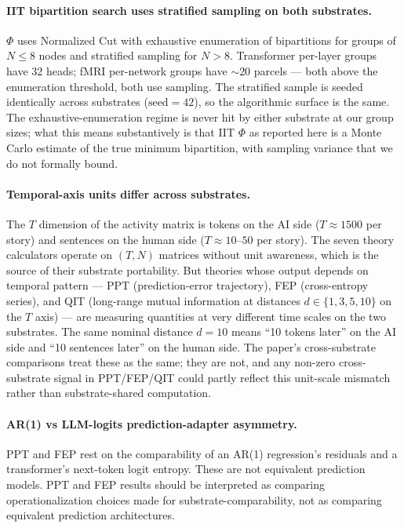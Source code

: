 \documentclass[11pt,a4paper]{article}
\begin{document}
\paragraph{IIT bipartition search uses stratified sampling on both substrates.} $\Phi$ uses Normalized Cut with exhaustive enumeration of bipartitions for groups of $N \leq 8$ nodes and stratified sampling for $N > 8$. Transformer per-layer groups have 32 heads; fMRI per-network groups have $\sim$20 parcels --- both above the enumeration threshold, both use sampling. The stratified sample is seeded identically across substrates ($\text{seed} = 42$), so the algorithmic surface is the same. The exhaustive-enumeration regime is never hit by either substrate at our group sizes; what this means substantively is that IIT $\Phi$ as reported here is a Monte Carlo estimate of the true minimum bipartition, with sampling variance that we do not formally bound.

\paragraph{Temporal-axis units differ across substrates.} The $T$ dimension of the activity matrix is tokens on the AI side ($T \approx 1500$ per story) and sentences on the human side ($T \approx 10$--$50$ per story). The seven theory calculators operate on $(T, N)$ matrices without unit awareness, which is the source of their substrate portability. But theories whose output depends on temporal pattern --- PPT (prediction-error trajectory), FEP (cross-entropy series), and QIT (long-range mutual information at distances $d \in \{1, 3, 5, 10\}$ on the $T$ axis) --- are measuring quantities at very different time scales on the two substrates. The same nominal distance $d = 10$ means ``10 tokens later'' on the AI side and ``10 sentences later'' on the human side. The paper's cross-substrate comparisons treat these as the same; they are not, and any non-zero cross-substrate signal in PPT/FEP/QIT could partly reflect this unit-scale mismatch rather than substrate-shared computation.

\paragraph{AR(1) vs LLM-logits prediction-adapter asymmetry.} PPT and FEP rest on the comparability of an AR(1) regression's residuals and a transformer's next-token logit entropy. These are not equivalent prediction models. PPT and FEP results should be interpreted as comparing operationalization choices made for substrate-comparability, not as comparing equivalent prediction architectures.
\end{document}
